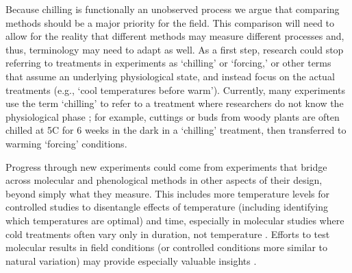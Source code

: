 \documentclass[11pt]{article}
\begin{document}
Because chilling is functionally an unobserved process we argue that comparing methods should be a major priority for the field. This comparison will need to allow for the reality that different methods may measure different processes and, thus, terminology may need to adapt as well. As a first step, research could stop referring to treatments in experiments as `chilling' or `forcing,' or other terms that assume an underlying physiological state, and instead focus on the actual treatments (e.g., `cool temperatures before warm'). Currently, many experiments use the term `chilling' to refer to a treatment where researchers do not know the physiological phase \citep{flynn2018,ospreebbms}; for example, cuttings or buds from woody plants are often chilled at 5\degree C for 6 weeks in the dark in a `chilling' treatment, then transferred to warming `forcing' conditions. %

Progress through new experiments could come from experiments that bridge across molecular and phenological methods in other aspects of their design, beyond simply what they measure. This includes more temperature levels for controlled studies to disentangle effects of temperature (including identifying which temperatures are optimal) and time, especially in molecular studies where cold treatments often vary only in duration, not temperature \citep[e.g.,][]{rinne2011,pan2023epigenetic}. Efforts to test molecular results in field conditions (or controlled conditions more similar to natural variation) may provide especially valuable insights   \citep[e.g.][and see below, `Model experimental and observational data together']{Wilczek:2009oa,Burghardt2015}. 
\end{document}
